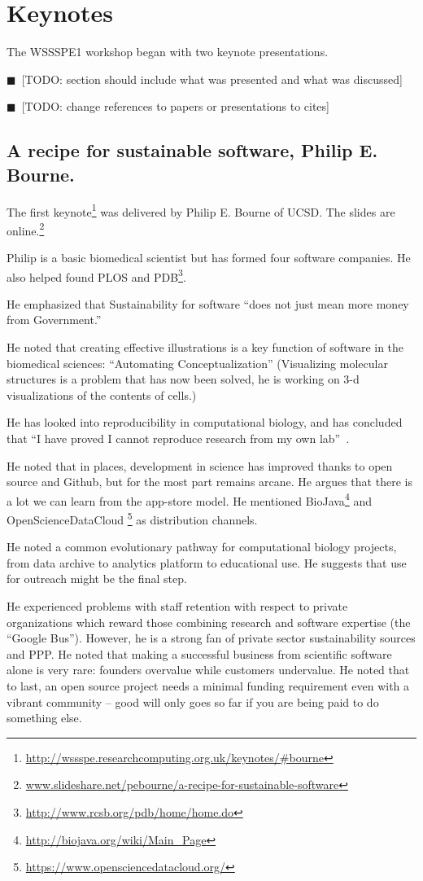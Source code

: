 \documentclass[11pt, oneside]{amsart}
\newcommand{\todo}[1]{{\color{blue}$\blacksquare$~\textsf{[TODO: #1]}}}
\begin{document}
\section{Keynotes}

The WSSSPE1 workshop began with two keynote presentations.

\todo{section should include what was presented and what was discussed}

\todo{change references to papers or presentations to cites}

\subsection{A recipe for sustainable software, Philip E. Bourne.}

The first keynote\footnote{\url{http://wssspe.researchcomputing.org.uk/keynotes/\#bourne}}
was delivered by Philip E. Bourne of UCSD. The slides
are online.\footnote{\url{www.slideshare.net/pebourne/a-recipe-for-sustainable-software}}

Philip is a basic biomedical scientist but has formed four software
companies. He also helped found PLOS and PDB\footnote{\url{http://www.rcsb.org/pdb/home/home.do}}.

He emphasized that Sustainability for software ``does not just mean more
money from Government.''

He noted that creating effective illustrations is a key function of
software in the biomedical sciences: ``Automating Conceptualization''
(Visualizing molecular structures is a problem that has now been solved,
he is working on 3-d visualizations of the contents of cells.)

He has looked into reproducibility in computational biology, and has
concluded that ``I have proved I cannot reproduce research from my own
lab''~\cite{Veretnik}.

He noted that in places, development in science has improved thanks to
open source and Github, but for the most part remains arcane. He argues
that there is a lot we can learn from the app-store model. He
mentioned BioJava\footnote{\url{http://biojava.org/wiki/Main_Page}} and
OpenScienceDataCloud \footnote{\url{https://www.opensciencedatacloud.org/}} as
distribution channels.

He noted a common evolutionary pathway for computational biology
projects, from data archive to analytics platform to educational use. He
suggests that use for outreach might be the final step.

He experienced problems with staff retention with respect to private organizations which reward 
those combining research and software expertise (the ``Google Bus''). However,
he is a strong fan of private sector sustainability sources and PPP. He
noted that making a successful business from scientific software alone
is very rare: founders overvalue while customers undervalue. He noted
that to last, an open source project needs a minimal funding requirement
even with a vibrant community -- good will only goes so far if you are
being paid to do something else.
\end{document}
